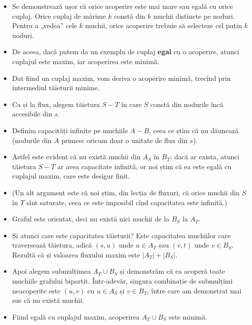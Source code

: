 \documentclass[../main.tex]{subfiles}
\begin{document}
\begin{itemize}
  \item Se demonstrează ușor că orice acoperire este mai mare sau egală cu orice cuplaj. Orice cuplaj de mărime $k$ constă din $k$ muchii distincte pe noduri. Pentru a „vedea” cele $k$ muchii, orice acoperire trebuie să selecteze cel puțin $k$ noduri.

  \item De aceea, dacă putem da un exemplu de cuplaj \textbf{egal} cu o acoperire, atunci cuplajul este maxim, iar acoperirea este minimă.

  \item Dat fiind un cuplaj maxim, vom deriva o acoperire minimă, trecînd prin intermediul tăieturii minime.

  \item Ca și la flux, alegem tăietura $S-T$ în care $S$ constă din nodurile încă accesibile din $s$.

  \item Definim capacități infinite pe muchiile $A-B$, ceea ce știm că nu dăunează (nodurile din $A$ primesc oricum doar o unitate de flux din $s$).

  \item Astfel este evident că nu există muchii din $A_S$ în $B_T$: dacă ar exista, atunci tăietura $S-T$ ar avea capacitate infinită, or noi știm că ea este egală cu cuplajul maxim, care este desigur finit.

  \item (Un alt argument este că noi știm, din lecția de fluxuri, că orice muchii din $S$ în $T$ sînt saturate, ceea ce este imposibil cînd capacitatea este infinită.)

  \item Graful este orientat, deci nu există nici muchii de la $B_S$ la $A_T$.

  \item Și atunci care este capacitatea tăieturii? Este capacitatea muchiilor care traversează tăietura, adică $(s, u)$ unde $u \in A_T$ sau $(v, t)$  unde $v \in B_S$. Rezultă că și valoarea fluxului maxim este $|A_T| + |B_S|$.

  \item Apoi alegem submulțimea $A_T \cup B_S$ și demonstrăm că ea acoperă toate muchiile grafului bipartit. Într-adevăr, singura combinație de submulțimi neacoperite este $(u, v)$ cu $u \in A_S$ și $v \in B_T$, între care am demonstrat mai sus că nu există muchii.

  \item Fiind egală cu cuplajul maxim, acoperirea $A_T \cup B_S$ este minimă.
\end{itemize}
\end{document}
